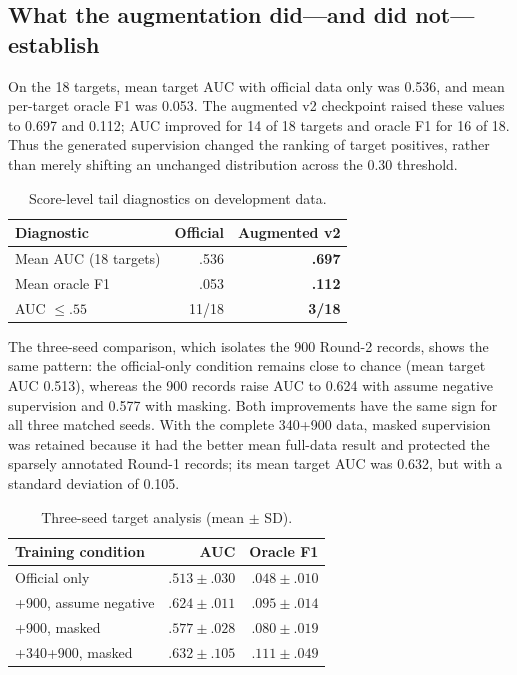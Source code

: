 \documentclass[sigconf,article,a4paper]{acmart}
\begin{document}
\subsection{What the augmentation did---and did not---establish}

On the 18 targets, mean target AUC with official data only was 0.536, and mean
per-target oracle F1 was 0.053. The augmented v2 checkpoint raised these values
to 0.697 and
0.112; AUC improved for 14 of 18 targets and oracle F1 for 16 of 18. Thus the
generated supervision changed the ranking of target positives, rather than
merely shifting an unchanged distribution across the 0.30 threshold.

\begin{table}[t]
  \caption{Score-level tail diagnostics on development data.}
  \label{tab:tail}
  \small
  \begin{tabular}{@{}lrr@{}}
    \toprule
    Diagnostic & Official & Augmented v2 \\
    \midrule
    Mean AUC (18 targets) & .536 & \textbf{.697} \\
    Mean oracle F1 & .053 & \textbf{.112} \\
    AUC $\leq .55$ & 11/18 & \textbf{3/18} \\
    \bottomrule
  \end{tabular}
\end{table}

The three-seed comparison, which isolates the 900 Round-2 records, shows the
same pattern: the official-only condition remains close to chance
(mean target AUC 0.513), whereas the 900 records raise AUC to 0.624 with
assume negative supervision and 0.577 with masking. Both improvements have the
same sign for all three matched seeds. With the complete 340+900 data, masked
supervision was retained because it had the better mean full-data result and
protected the sparsely annotated Round-1 records; its mean target AUC was
0.632, but with a standard deviation of 0.105.

\begin{table}[t]
  \caption{Three-seed target analysis (mean $\pm$ SD).}
  \label{tab:seeds}
  \small
  \begin{tabular}{@{}lrr@{}}
    \toprule
    Training condition & AUC & Oracle F1 \\
    \midrule
    Official only & $.513\pm.030$ & $.048\pm.010$ \\
    +900, assume negative & $\mathbf{.624\pm.011}$ & $\mathbf{.095\pm.014}$ \\
    +900, masked & $.577\pm.028$ & $.080\pm.019$ \\
    +340+900, masked & $.632\pm.105$ & $.111\pm.049$ \\
    \bottomrule
  \end{tabular}
\end{table}
\end{document}
